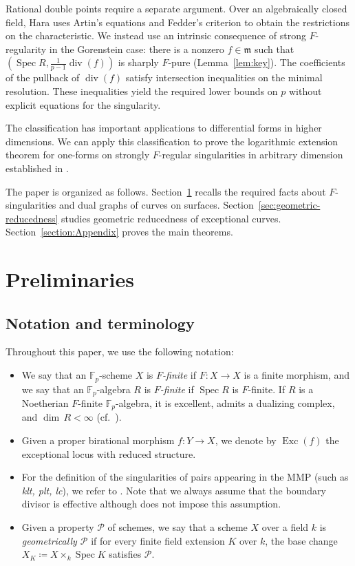 \documentclass[12pt]{amsart}
\def\Spec{\operatorname{Spec}}
\def\Exc{\operatorname{Exc}}
\def\m{{\mathfrak m}}
\theoremstyle{plain}
\theoremstyle{definition}
\theoremstyle{remark}
\newtheorem{defn and notation}[thm]{Definition and Notation}
\theoremstyle{plain}
\numberwithin{equation}{thm}
\begin{document}
Rational double points require a separate argument. Over an algebraically closed field, Hara uses Artin's equations \cite{Art} and Fedder's criterion to obtain the restrictions on the characteristic. 
We instead use an intrinsic consequence of strong $F$-regularity in the Gorenstein case: there is a nonzero $f\in\m$ such that $(\Spec R,\frac{1}{p-1}\operatorname{div}(f))$ is sharply $F$-pure (Lemma~\ref{lem:key}). 
The coefficients of the pullback of $\operatorname{div}(f)$ satisfy intersection inequalities on the minimal resolution. 
These inequalities yield the required lower bounds on $p$ without explicit equations for the singularity.

The classification has important applications to differential forms in higher dimensions. We can apply this classification to prove the logarithmic extension theorem for one-forms on strongly $F$-regular singularities in arbitrary dimension established in \cite{Kawakami-Sato}.

The paper is organized as follows. Section~\ref{sec:preliminaries} recalls the required facts about $F$-singularities and dual graphs of curves on surfaces. Section~\ref{sec:geometric-reducedness} studies geometric reducedness of exceptional curves. Section~\ref{section:Appendix} proves the main theorems.



\section{Preliminaries}\label{sec:preliminaries}


\subsection{Notation and terminology}
Throughout this paper, we use the following notation:
\begin{itemize}
\item We say that an $\mathbb{F}_p$-scheme $X$ is {\em $F$-finite} if $F \colon X \to X$ is a finite morphism, and  we say that an $\mathbb{F}_p$-algebra $R$ is {\em $F$-finite} if $\Spec R$ is $F$-finite. If $R$ is a Noetherian $F$-finite $\mathbb{F}_p$-algebra, it is excellent, admits a dualizing complex, and $\dim\,R<\infty$ (cf.~\cite[Remark 13.6]{Gab04}).
\item Given a proper birational morphism $f\colon Y\to X$, we denote by $\Exc(f)$ the exceptional locus with reduced structure.
\item For the definition of the singularities of pairs appearing in the MMP (such as \emph{klt, plt, lc}), we refer to \cite[Definition 2.8]{Kol13}. Note that we always assume that the boundary divisor is effective although \cite[Definition 2.8]{Kol13} does not impose this assumption.
\item Given a property $\mathcal{P}$ of schemes, we say that a scheme $X$ over a field $k$ is \emph{geometrically $\mathcal{P}$} if for every finite field extension $K$ over $k$, the base change $X_K \coloneqq X \times_k \Spec K$ satisfies $\mathcal{P}$.
\end{itemize}
\end{document}
